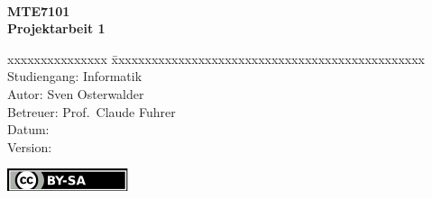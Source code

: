 \begin{titlepage}
    \begin{flushleft}
        \fontsize{26pt}{28pt}\selectfont
        \titel{}\\
        \vspace{3mm}
        \textbf{MTE7101} \\
        \vspace{6mm}
        \fontsize{14pt}{16pt}\selectfont
        \textbf{Projektarbeit 1} \\
        \vspace{3mm}

        \fontsize{10pt}{17pt}\selectfont
        \begin{tabbing}
        xxxxxxxxxxxxxxx   \= xxxxxxxxxxxxxxxxxxxxxxxxxxxxxxxxxxxxxxxxxxxxxxx \kill
        Studiengang:      \> Informatik                                         \\
        Autor:            \> Sven Osterwalder\protect\footnotemark[1]{}         \\
        Betreuer:         \> Prof.~Claude Fuhrer\protect\footnotemark[2]{} \\
        Datum:            \> \vhCurrentDate{}\\
        Version:          \> \vhCurrentVersion\\
        \end{tabbing}
    \end{flushleft}

    \vfill
    \includegraphics[height=\baselineskip]{img/by-sa}\\ \small{}

    \thispagestyle{titlepageStyle}

\end{titlepage}
